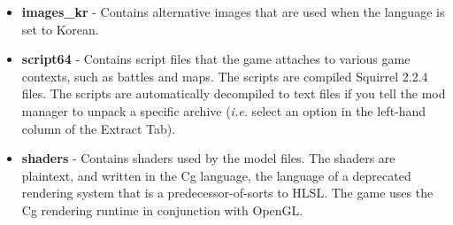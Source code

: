 \documentclass{article}
\begin{document}
\begin{itemize}
\item \textbf{images\_kr} - Contains alternative images that are used when the language is set to Korean.
\item \textbf{script64} - Contains script files that the game attaches to various game contexts, such as battles and maps. The scripts are compiled Squirrel 2.2.4 files. The scripts are automatically decompiled to text files if you tell the mod manager to unpack a specific archive (\textit{i.e.} select an option in the left-hand column of the Extract Tab).
\item \textbf{shaders} - Contains shaders used by the model files. The shaders are plaintext, and written in the Cg language, the language of a deprecated rendering system that is a predecessor-of-sorts to HLSL. The game uses the Cg rendering runtime in conjunction with OpenGL.
\end{itemize}
\end{document}
